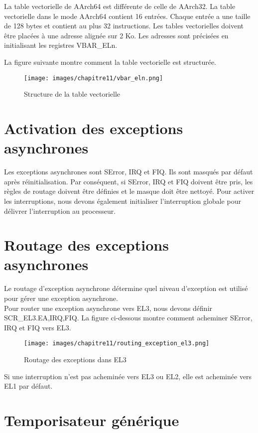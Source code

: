 \documentclass[12pt,a4paper,oneside]{book}
\begin{document}
	La table vectorielle de AArch64 est différente de celle de AArch32. La table vectorielle dans le mode AArch64 contient 16 entrées. Chaque entrée a une taille de 128 bytes et contient au plus 32 instructions.
	Les tables vectorielles doivent être placées à une adresse alignée sur 2 Ko. Les adresses sont précisées en initialisant les registres VBAR\_ELn.
	
	La figure suivante montre comment la table vectorielle est structurée.\\
	
	\begin{figure}[H]
		\centering
		\texttt{[image: images/chapitre11/vbar\_eln.png]}
		\caption{Structure de la table vectorielle}
		\label{Types}
	\end{figure}
	
	\section{Activation des exceptions asynchrones}
	
	Les exceptions asynchrones sont SError, IRQ et FIQ. Ils sont masqués par défaut après réinitialisation. Par conséquent, si SError, IRQ et FIQ doivent être pris, les règles de routage doivent être définies et le masque doit être nettoyé.
	Pour activer les interruptions, nous devons également initialiser l'interruption globale pour délivrer l'interruption au processeur.
	
	\section{Routage des exceptions asynchrones}
	
	Le routage d'exception asynchrone détermine quel niveau d'exception est utilisé pour gérer une
	exception asynchrone.\\
	Pour router une exception asynchrone vers EL3, nous devons définir SCR\_EL3.{EA,IRQ,FIQ}.
	La figure ci-dessous montre comment acheminer SError, IRQ et FIQ vers EL3.
	
	\begin{figure}[H]
		\centering
		\texttt{[image: images/chapitre11/routing\_exception\_el3.png]}
		\caption{Routage des exceptions dans EL3}
		\label{Types}
	\end{figure}
	
	Si une interruption n'est pas acheminée vers EL3 ou EL2, elle est acheminée vers EL1 par défaut.
	
	\section{Temporisateur générique}
\end{document}
